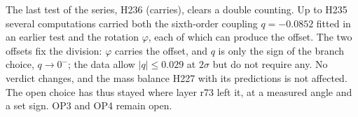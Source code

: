 The last test of the series, H236 (carries), clears a double counting.
Up to H235 several computations carried both the sixth-order coupling
$q=-0.0852$ fitted in an earlier test and the rotation $\varphi$, each of
which can produce the offset. The two offsets fix the division:
$\varphi$ carries the offset, and $q$ is only the sign of the branch
choice, $q\to0^-$; the data allow $|q|\leq0.029$ at $2\sigma$ but do not
require any. No verdict changes, and the mass balance H227 with its
predictions is not affected. The open choice has thus stayed where layer
r73 left it, at a measured angle and a set sign. OP3 and OP4 remain
open.
